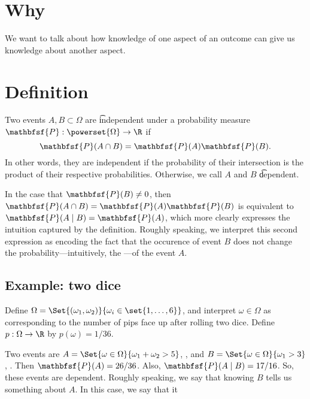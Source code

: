 

\section*{Why}

We want to talk about how knowledge of one aspect of an outcome can give us knowledge about another aspect.

\section*{Definition}

Two events $A, B \subset \Omega $ are \t{independent} under a probability measure $\mathbfsf{P} : \powerset{\Omega } \to \R $ if
    \[
\mathbfsf{P} (A \cap  B) = \mathbfsf{P} (A)\mathbfsf{P} (B).
    \]
In other words, they are independent if the probability of their intersection is the product of their respective probabilities.
Otherwise, we call $A$ and $B$ \t{dependent}.

In the case that $\mathbfsf{P} (B) \neq 0$, then $\mathbfsf{P} (A \cap  B) = \mathbfsf{P} (A)\mathbfsf{P} (B)$ is equivalent to $\mathbfsf{P} (A \mid B) = \mathbfsf{P} (A)$, which more clearly expresses the intuition captured by the definition.
Roughly speaking, we interpret this second expression as encoding the fact that the occurence of event $B$ does not change the probability---intuitively, the ---of the event $A$.

\subsection*{Example: two dice}

Define $\Omega  = \Set{(\omega _1, \omega _2)}{ \omega _i \in \set{1, \dots , 6}}$, and interpret $\omega  \in \Omega $ as corresponding to the number of pips face up after rolling two dice.
Define $p: \Omega  \to \R $ by $p(\omega ) = 1/36$.

Two events are $A = \Set{\omega  \in \Omega }{ \omega _1 + \omega _2 > 5}$, , and $B = \Set{\omega  \in \Omega }{\omega _1 > 3}$, .
Then $\mathbfsf{P} (A) = 26/36$.
Also, $\mathbfsf{P} (A \mid  B) = 17/16$.
So, these events are dependent.
Roughly speaking, we say that knowing $B$ tells us something about $A$.
In this case, we say that it 

